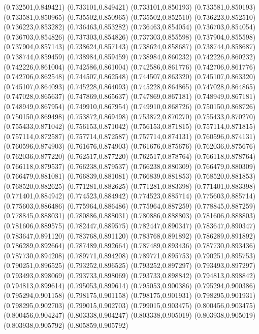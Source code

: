 (0.732501,0.849421)
(0.733101,0.849421)
(0.733101,0.850193)
(0.733581,0.850193)
(0.733581,0.850965)
(0.735502,0.850965)
(0.735502,0.852510)
(0.736223,0.852510)
(0.736223,0.853282)
(0.736463,0.853282)
(0.736463,0.854054)
(0.736703,0.854054)
(0.736703,0.854826)
(0.737303,0.854826)
(0.737303,0.855598)
(0.737904,0.855598)
(0.737904,0.857143)
(0.738624,0.857143)
(0.738624,0.858687)
(0.738744,0.858687)
(0.738744,0.859459)
(0.738984,0.859459)
(0.738984,0.860232)
(0.742226,0.860232)
(0.742226,0.861004)
(0.742586,0.861004)
(0.742586,0.861776)
(0.742706,0.861776)
(0.742706,0.862548)
(0.744507,0.862548)
(0.744507,0.863320)
(0.745107,0.863320)
(0.745107,0.864093)
(0.745228,0.864093)
(0.745228,0.864865)
(0.747028,0.864865)
(0.747028,0.865637)
(0.747869,0.865637)
(0.747869,0.867181)
(0.748949,0.867181)
(0.748949,0.867954)
(0.749910,0.867954)
(0.749910,0.868726)
(0.750150,0.868726)
(0.750150,0.869498)
(0.753872,0.869498)
(0.753872,0.870270)
(0.755433,0.870270)
(0.755433,0.871042)
(0.756153,0.871042)
(0.756153,0.871815)
(0.757114,0.871815)
(0.757114,0.872587)
(0.757714,0.872587)
(0.757714,0.874131)
(0.760596,0.874131)
(0.760596,0.874903)
(0.761676,0.874903)
(0.761676,0.875676)
(0.762036,0.875676)
(0.762036,0.877220)
(0.762517,0.877220)
(0.762517,0.878764)
(0.766118,0.878764)
(0.766118,0.879537)
(0.766238,0.879537)
(0.766238,0.880309)
(0.766479,0.880309)
(0.766479,0.881081)
(0.766839,0.881081)
(0.766839,0.881853)
(0.768520,0.881853)
(0.768520,0.882625)
(0.771281,0.882625)
(0.771281,0.883398)
(0.771401,0.883398)
(0.771401,0.884942)
(0.774523,0.884942)
(0.774523,0.885714)
(0.775603,0.885714)
(0.775603,0.886486)
(0.775964,0.886486)
(0.775964,0.887259)
(0.778845,0.887259)
(0.778845,0.888031)
(0.780886,0.888031)
(0.780886,0.888803)
(0.781606,0.888803)
(0.781606,0.889575)
(0.782447,0.889575)
(0.782447,0.890347)
(0.783647,0.890347)
(0.783647,0.891120)
(0.783768,0.891120)
(0.783768,0.891892)
(0.786289,0.891892)
(0.786289,0.892664)
(0.787489,0.892664)
(0.787489,0.893436)
(0.787730,0.893436)
(0.787730,0.894208)
(0.789771,0.894208)
(0.789771,0.895753)
(0.790251,0.895753)
(0.790251,0.896525)
(0.793252,0.896525)
(0.793252,0.897297)
(0.793493,0.897297)
(0.793493,0.898069)
(0.793733,0.898069)
(0.793733,0.898842)
(0.794813,0.898842)
(0.794813,0.899614)
(0.795053,0.899614)
(0.795053,0.900386)
(0.795294,0.900386)
(0.795294,0.901158)
(0.798175,0.901158)
(0.798175,0.901931)
(0.798295,0.901931)
(0.798295,0.902703)
(0.799015,0.902703)
(0.799015,0.903475)
(0.800456,0.903475)
(0.800456,0.904247)
(0.803338,0.904247)
(0.803338,0.905019)
(0.803938,0.905019)
(0.803938,0.905792)
(0.805859,0.905792)
